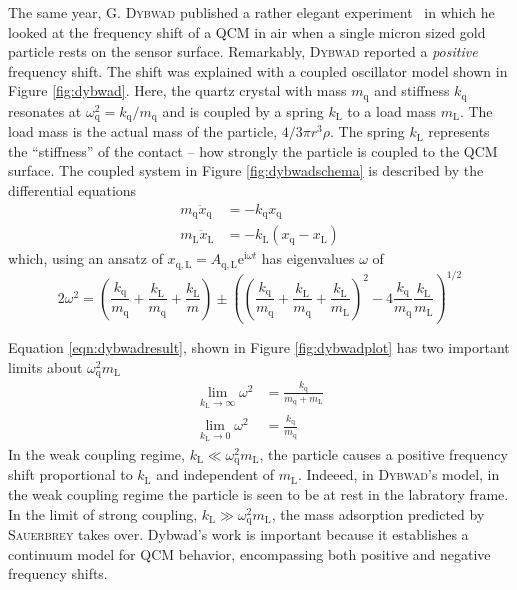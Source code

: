 \documentclass[a4paper,titlepage,onecolumn]{report}
\newcommand{\Figure}[1]{Figure \ref{#1}}
\newcommand{\Equation}[1]{Equation \ref{#1}}
\newcommand{\name}[1]{\textsc{#1}}
\newcommand{\me}{{\mathrm{e}}}
\newcommand{\mi}{{\mathrm{i}}}
\newcommand{\kl}{k_\mathrm{L}}
\newcommand{\ml}{m_\mathrm{L}}
\newcommand{\kq}{k_\mathrm{q}}
\newcommand{\mq}{m_\mathrm{q}}
\newcommand{\omegaq}{\omega_\mathrm{q}}
\begin{document}
The same year, \name{G. Dybwad} published a rather elegant
experiment~\cite{dybwad} in which he looked at the frequency shift of a QCM
in air when a single micron sized gold particle rests on the sensor
surface.  Remarkably, \name{Dybwad} reported a \textit{positive}
frequency shift.  The shift was explained with a coupled oscillator model
shown in \Figure{fig:dybwad}.
Here, the quartz crystal with mass $\mq$ and stiffness
$\kq$ resonates at
$\omega_\mathrm{q}^2=\kq/\mq$ and is coupled by a spring
$\kl$ to a load mass $\ml$.  The load mass is the actual mass of
the particle, $4/3 \pi r^3 \rho$.  The spring $\kl$ represents the
``stiffness'' of the contact -- how strongly the particle is coupled to the
QCM surface.  The coupled system in \Figure{fig:dybwadschema} is described
by the differential equations
\begin{align}
 \mq \ddot{x}_\mathrm{q} &= -\kq x_\mathrm{q}\\
 \ml \ddot{x}_\mathrm{L} &= -\kl (x_\mathrm{q}-x_\mathrm{L})
\end{align}
which, using an ansatz of
$x_{\mathrm{q},\mathrm{L}}=A_{\mathrm{q},\mathrm{L}}\me^{\mi \omega t}$ has
eigenvalues $\omega$ of
\begin{equation}
 2\omega^{2}=\left(\frac{\kq}{\mq}+\frac{\kl}{\mq}+\frac{\kl}{m}\right)\pm\left(\left(\frac{\kq}{\mq}+\frac{\kl}{\mq}+\frac{\kl}{\ml}\right)^{2}-4\frac{\kq}{\mq}\frac{\kl}{\ml}\right)^{1/2}
 \label{eqn:dybwadresult}
\end{equation}

\Equation{eqn:dybwadresult}, shown in \Figure{fig:dybwadplot} has two
important limits about $\omegaq^2 \ml$
\begin{align}
 \lim_{\kl\to\infty} \omega^2 &= \frac{\kq}{\mq+\ml}\\
 \lim_{\kl\to0} \omega^2 &= \frac{\kq}{\mq}
\end{align}
In the weak coupling regime, $\kl\ll\omegaq^2\ml$, the particle causes a
positive frequency shift proportional to $\kl$ and independent of $\ml$.
Indeeed, in \name{Dybwad}'s model, in the weak coupling regime the
particle is seen to be at rest in the labratory frame. In the limit of strong
coupling, $\kl\gg\omegaq^2\ml$, the mass adsorption predicted by
\name{Sauerbrey} takes over.  Dybwad's work is important because it
establishes a continuum model for QCM behavior, encompassing both positive
and negative frequency shifts.
\end{document}
